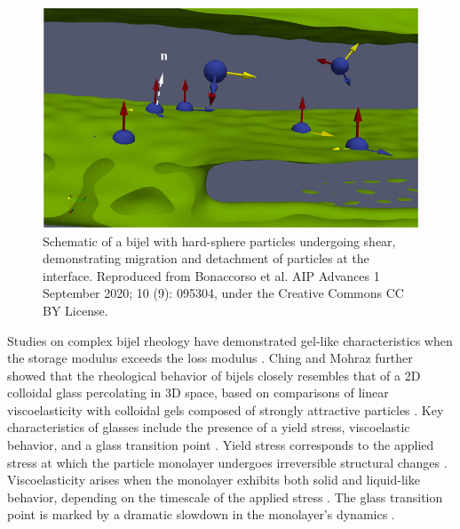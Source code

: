 \begin{figure}
    \centering
    \includegraphics[scale = 2]{figures/literature_review/bijel_under_shear.jpeg}
    \caption{Schematic of a bijel with hard-sphere particles undergoing shear, demonstrating migration and detachment of 
             particles at the interface. \cite{bonaccorso_shear_2020} Reproduced from Bonaccorso et al. AIP Advances 1 
             September 2020; 10 (9): 095304, under the Creative Commons CC BY License.}
    \label{fig:bijel_under_shear}
\end{figure} 

Studies on complex bijel rheology have demonstrated gel-like characteristics when the storage modulus exceeds the loss modulus \cite{lee_making_2013, bai_dynamics_2015}. 
Ching and Mohraz further showed that the rheological behavior of bijels closely resembles that of a 2D colloidal glass percolating in 3D space, based on comparisons of 
linear viscoelasticity with colloidal gels composed of strongly attractive particles \cite{ching_bijel_2022}. Key characteristics of glasses include the presence of a 
yield stress, viscoelastic behavior, and a glass transition point \cite{pham_yielding_2008, weeks_introduction_2017}. Yield stress corresponds to the applied stress at 
which the particle monolayer undergoes irreversible structural changes \cite{pham_yielding_2008}. Viscoelasticity arises when the monolayer exhibits both solid and 
liquid-like behavior, depending on the timescale of the applied stress \cite{pham_yielding_2008}. The glass transition point is marked by a dramatic slowdown in the 
monolayer's dynamics \cite{weeks_introduction_2017}. 



